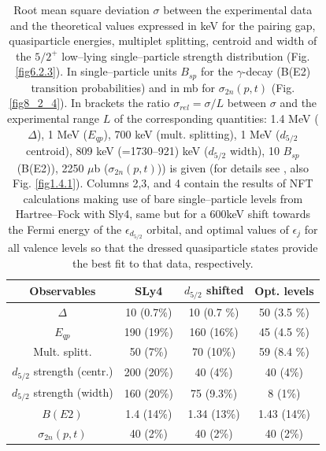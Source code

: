 \begin{table}
\begin{center}
\begin{tabular}{|c|c|c|c|}
\hline
  Observables  &  SLy4 &  $d_{5/2}$ shifted  & Opt. levels \\ 
\hline
$\Delta$ &  10  (0.7\%) &  10  (0.7 \%) & 50   (3.5 \%)\\
 $E_{qp}$ & 190 (19\%)  & 160  (16\%)   & 45  (4.5 \%) \\
 Mult.  splitt. & 50  (7\%) & 70  (10\%)    & 59  (8.4 \%) \\
  $d_{5/2}$ strength (centr.) & 200  (20\%)  & 40  (4\%)   & 40  (4\%) \\
$d_{5/2}$ strength (width) & 160  (20\%)  &75  (9.3\%)  &  8  (1\%) \\
$B(E2)$ & 1.4  (14\%) & 1.34  (13\%)   & 1.43  (14\%) \\ 
$\sigma_{2n}(p,t)$ & 40 (2\%) & 40 (2\%) & 40 (2\%) \\
 \hline
\end{tabular}
\caption{Root  mean square deviation $\sigma$ between  the experimental data and the theoretical values expressed in keV for the pairing gap, quasiparticle energies, multiplet splitting, centroid and width of the  
$5/2^+$ low--lying single--particle strength distribution (Fig. \ref{fig6.2.3}). In single--particle units $B_{sp}$ for the $\gamma$-decay  (B(E2) transition probabilities) and in mb for $\sigma_{2n}(p,t)$ (Fig. \ref{fig8_2_4}). In brackets
the ratio $\sigma_{rel}=\sigma/L$ between $\sigma$ and the experimental  range $L$ of the corresponding quantities: 1.4 MeV ($\Delta$), 1 MeV ($E_{qp}$), 700 keV (mult. splitting), 
1 MeV ($d_{5/2}$ centroid),  809 keV (=1730--921) keV  ($d_{5/2}$ width), 10 $B_{sp}$ (B(E2)), 2250 $\mu$b ($\sigma_{2n}(p,t)$)) is given (for details see \cite{Idini:15}, also Fig. \ref{fig1.4.1}). Columns 2,3, and 4 contain the results of NFT calculations making use of bare single--particle levels from Hartree--Fock with Sly4, same but for a 600keV shift towards the Fermi energy of the $\epsilon_{d_{5/2}}$ orbital, and optimal values of $\epsilon_j$ for all valence levels so that the dressed quasiparticle states provide the best fit to that data, respectively.}
\label{tab1.4.1}
\end{center}
\end{table}


